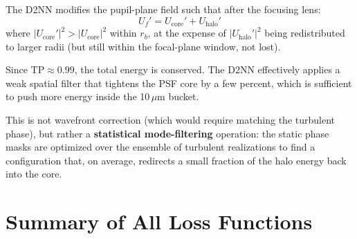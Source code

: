 \documentclass[11pt,a4paper]{article}
\begin{document}
The D2NN modifies the pupil-plane field such that after the focusing lens:
\begin{equation}
U_f' = U_{\mathrm{core}}' + U_{\mathrm{halo}}'
\end{equation}
where $|U_{\mathrm{core}}'|^2 > |U_{\mathrm{core}}|^2$ within $r_b$, at the expense of $|U_{\mathrm{halo}}'|^2$ being redistributed to larger radii (but still within the focal-plane window, not lost).

Since $\mathrm{TP} \approx 0.99$, the total energy is conserved. The D2NN effectively applies a weak spatial filter that tightens the PSF core by a few percent, which is sufficient to push more energy inside the 10\,$\mu$m bucket.

This is not wavefront correction (which would require matching the turbulent phase), but rather a \textbf{statistical mode-filtering} operation: the static phase masks are optimized over the ensemble of turbulent realizations to find a configuration that, on average, redirects a small fraction of the halo energy back into the core.

\section{Summary of All Loss Functions}
\end{document}

